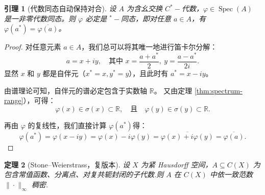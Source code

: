 \documentclass{ctexart}
\newtheorem{theorem}{定理}[section]
\newtheorem{lemma}[theorem]{引理}
\theoremstyle{plain}
\newtheorem*{proof}{证明}
\theoremstyle{plain}
\DeclareMathOperator{\Spec}{Spec}
\begin{document}
\begin{lemma}[代数同态自动保持对合]\label{lem:homo-involution}
    设 $A$ 为含幺交换 $C^*-\!$代数，$\varphi \in \Spec(A)$ 是一非零代数同态。则 $\varphi$ 必定是 ${}^*-\!$同态，即对任意 $a \in A$，有 $\varphi(a^*) = \overline{\varphi(a)}$。
\end{lemma}
\begin{proof}


    对任意元素 $a \in A$，我们总可以将其唯一地进行笛卡尔分解：
    \begin{equation*}
        a = x + i y, \quad \text{其中 } x = \frac{a+a^*}{2},\ y = \frac{a-a^*}{2i}.
    \end{equation*}
    显然 $x$ 和 $y$ 都是自伴元（$x^* = x, y^* = y$），且此时有 $a^* = x - i y$。
    
    由谱理论可知，自伴元的谱必定包含于实数轴 $\mathbb{R}$。
    又由定理 \ref{thm:spectrum-range}），可得：
    \begin{equation*}
        \varphi(x) \in \sigma(x) \subset \mathbb{R}, \quad \text{且} \quad \varphi(y) \in \sigma(y) \subset \mathbb{R}.
    \end{equation*}
    
    再由 $\varphi$ 的复线性，我们直接计算 $\varphi(a^*)$得：
    \begin{equation*}
        \varphi(a^*) = \varphi(x - i y) = \varphi(x) - i \varphi(y) = \overline{\varphi(x) + i \varphi(y)} = \overline{\varphi(a)}.
    \end{equation*}

\end{proof}

\begin{theorem}[Stone--Weierstrass，复版本]\label{thm:stone-weierstrass}
    设 $X$ 为紧 Hausdorff 空间，$A \subseteq C(X)$ 为包含常值函数、分离点、对复共轭封闭的子代数.则 $A$ 在 $C(X)$ 中依一致范数 $\|\cdot\|_\infty$ 稠密.
\end{theorem}
\end{document}
